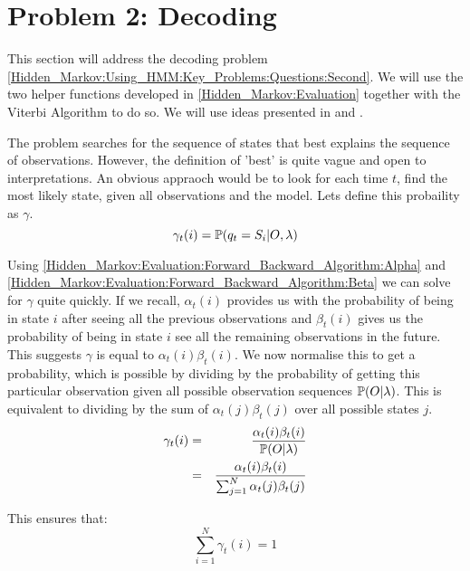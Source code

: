 \section{Problem 2: Decoding}
\label{Hidden_Markov:Decoding}

    This section will address the decoding problem \ref{Hidden_Markov:Using_HMM:Key_Problems:Questions:Second}. We will use the two helper functions developed in \ref{Hidden_Markov:Evaluation} together with the Viterbi Algorithm to do so. We will use ideas presented in \cite{Rabiner1986} and \cite{Forney1973}.

    The problem searches for the sequence of states that best explains the sequence of observations. However, the definition of 'best' is quite vague and open to interpretations. An obvious appraoch would be to look for each time $t$, find the most likely state, given all observations and the model. Lets define this probaility as $\gamma$.
    \begin{equation}
        \label{Hidden_Markov:Decoding:gamma}
        \gamma_t(i) = \mathbb{P} (q_t = S_i | O, \lambda)
    \end{equation}

    Using \ref{Hidden_Markov:Evaluation:Forward_Backward_Algorithm:Alpha} and \ref{Hidden_Markov:Evaluation:Forward_Backward_Algorithm:Beta} we can solve for $\gamma$ quite quickly. If we recall, $\alpha_t(i)$ provides us with the probability of being in state $i$ after seeing all the previous observations and $\beta_t(i)$ gives us the probability of being in state $i$ see all the remaining observations in the future. This suggests $\gamma$ is equal to $\alpha_t(i) \beta_t(i)$. We now normalise this to get a probability, which is possible by dividing by the probability of getting this particular observation given all possible observation sequences $\mathbb{P} (O|\lambda)$. This is equivalent to dividing by the sum of $\alpha_t(j) \beta_t(j)$ over all possible states $j$.
    \begin{eqnarray}
        \gamma_t(i) & = &  \dfrac{\alpha_t(i) \beta_t(i)}{\mathbb{P} (O|\lambda)} \\
                    & = &  \dfrac{\alpha_t(i) \beta_t(i)}{\sum_{j=1}^N \alpha_t(j) \beta_t(j)}
    \end{eqnarray}


    This ensures that:
    \begin{equation}
        \sum_{i=1}^N \gamma_t(i) = 1
    \end{equation}

